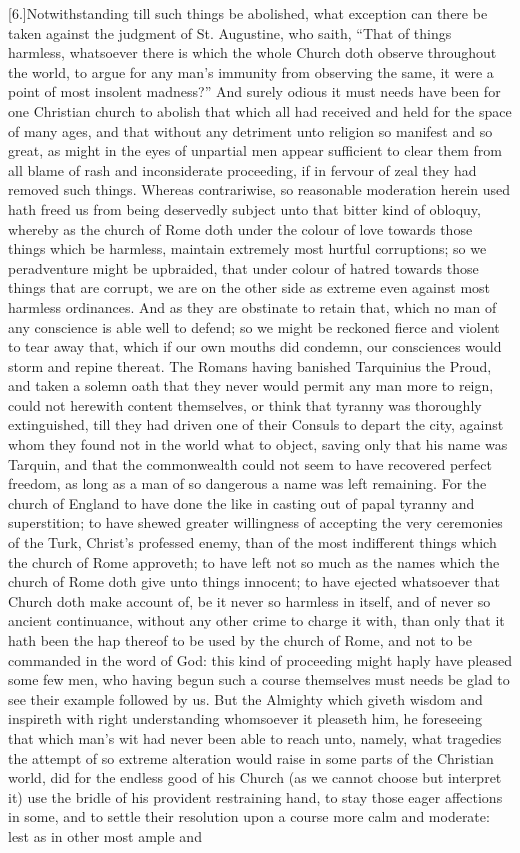 [6.]Notwithstanding till such things be abolished, what exception can there be taken against the judgment of St. Augustine, who saith, “That of things harmless, whatsoever there is which the whole Church doth observe throughout the world, to argue for any man’s immunity from observing the same, it were a point of most insolent madness?”  And surely odious it must needs have been for one Christian church to abolish that which all had received and held for the space of many ages, and that without any detriment unto religion so manifest and so great, as might in the eyes of unpartial men appear sufficient to clear them from all blame of rash and inconsiderate proceeding, if in fervour of zeal they had removed such things. Whereas contrariwise, so reasonable moderation herein used hath freed us from being deservedly subject unto that bitter kind of obloquy, whereby as the church of Rome doth under the colour of love towards those things which be harmless, maintain extremely most hurtful corruptions; so we peradventure might be upbraided, that under colour of hatred towards those things that are corrupt, we are on the other side as extreme even against most harmless ordinances. And as they are obstinate to retain that, which no man of any conscience is able well to defend; so we might be reckoned fierce and violent to tear away that, which if our own mouths did condemn, our consciences would storm and repine thereat. The Romans having banished Tarquinius the Proud, and taken a solemn oath that they never would permit any man more to reign, could not herewith content themselves, or think that tyranny was thoroughly extinguished, till they had driven one of their Consuls to depart the city, against whom they found not in the world what to object, saving only that his name was Tarquin, and that the commonwealth could not seem to have recovered perfect freedom, as long as a man of so dangerous a name was left remaining. For the church of England to have done the like in casting out of papal tyranny and superstition; to have shewed greater willingness of accepting the very ceremonies of the Turk, Christ’s professed enemy, than of the most indifferent things which the church of Rome approveth; to have left not so much as the names which the church of Rome doth give unto things innocent; to have ejected whatsoever that Church doth make account of, be it never so harmless in itself, and of never so ancient continuance, without any other crime to charge it with, than only that it hath been the hap thereof to be used  by the church of Rome, and not to be commanded in the word of God: this kind of proceeding might haply have pleased some few men, who having begun such a course themselves must needs be glad to see their example followed by us. But the Almighty which giveth wisdom and inspireth with right understanding whomsoever it pleaseth him, he foreseeing that which man’s wit had never been able to reach unto, namely, what tragedies the attempt of so extreme alteration would raise in some parts of the Christian world, did for the endless good of his Church (as we cannot choose but interpret it) use the bridle of his provident restraining hand, to stay those eager affections in some, and to settle their resolution upon a course more calm and moderate: lest as in other most ample and 